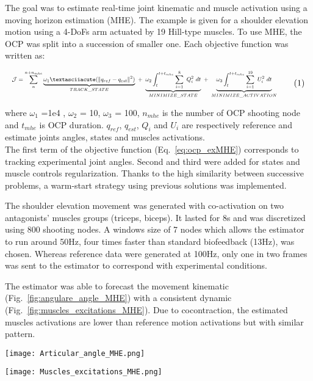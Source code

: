 The goal was to estimate real-time joint kinematic and muscle activation using a moving horizon estimation (MHE). The example is given for a shoulder elevation motion using a 4-DoFs arm actuated by 19 Hill-type muscles. To use MHE, the OCP was split into a succession of smaller one. Each objective function was written as:

\[
\resizebox{0.9\columnwidth}{!}{$
\begin{aligned} \noindent \mathcal{J} = \sum_{n}^{n + n_{mhe}}\underbrace{\omega_1´(\|q_{ref} - q_{est}\|^{2})}_{TRACK\_STATE} ~ + ~ \underbrace{\omega_2\int_t^{t+t_{mhe}} \sum_{i=1}^{8}~Q_{i}^2~dt}_{MINIMIZE\_ STATE} ~ + ~ \underbrace{\omega_3\int_t^{t+t_{mhe}} \sum_{i=1}^{19}~U_{i}^2~dt}_{MINIMIZE\_ ACTIVATION} 
\end{aligned}
$} \addtag \label{eq:ocp_exMHE} 
\]

\noindent where $\omega_1$ =1e4 , $\omega_2$ = 10, $\omega_3$ = 100, $n_{mhe}$ is the number of OCP shooting node and $t_{mhe}$ is OCP duration. $q_{ref}$, $q_{est}$, $Q_i$ and $U_i$ are respectively reference and estimate joints angles, states and muscles activations. \\  
The first term of the objective function (Eq.~\ref{eq:ocp_exMHE}) corresponds to tracking experimental joint angles. Second and third were added for states and muscle controls regularization. Thanks to the high similarity between successive problems, a warm-start strategy using previous solutions was implemented.  
 
 
The shoulder elevation movement was generated with co-activation on two antagonists' muscles groups (triceps, biceps). It lasted for 8s and was discretized using 800 shooting nodes. A windows size of 7 nodes which allows the estimator to run around 50Hz, four times faster than standard biofeedback (13Hz), was chosen. Whereas reference data were generated at 100Hz, only one in two frames was sent to the estimator to correspond with experimental conditions.
 
The estimator was able to forecast the movement kinematic (Fig.~\ref{fig:angulare_angle_MHE}) with a consistent dynamic (Fig.~\ref{fig:muscles_excitations_MHE}). Due to cocontraction, the estimated muscles activations are lower than reference motion activations but with similar pattern. 

\begin{figure*}[t!]
\centering
\texttt{[image: Articular\_angle\_MHE.png]}\\
\caption{Representation of estimate articlation angles (blue cross) and reference articulation angles (orange line).}
\label{fig:angulare_angle_MHE}
\end{figure*}
\begin{figure*}[t!]
\centering
\texttt{[image: Muscles\_excitations\_MHE.png]}\\
\caption{Representation of estimate muscles activations (blue) and co-contracted muscles activations (orange) with significative action on motion (activation $>$ 1e-3).}
\label{fig:muscles_excitations_MHE}
\end{figure*}
